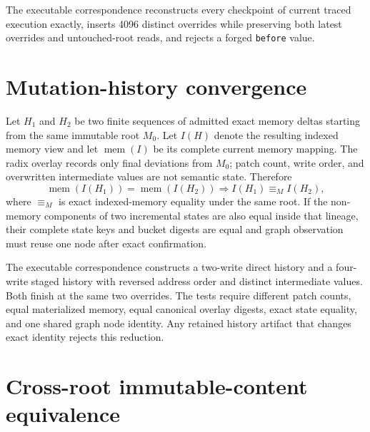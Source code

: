 \documentclass{article}
\begin{document}
The executable correspondence reconstructs every checkpoint of current traced
execution exactly, inserts 4096 distinct overrides while preserving both latest
overrides and untouched-root reads, and rejects a forged \texttt{before} value.

\section{Mutation-history convergence}

Let $H_1$ and $H_2$ be two finite sequences of admitted exact memory deltas
starting from the same immutable root $M_0$. Let $I(H)$ denote the resulting
indexed memory view and let $\operatorname{mem}(I)$ be its complete current
memory mapping. The radix overlay records only final deviations from $M_0$;
patch count, write order, and overwritten intermediate values are not semantic
state. Therefore
\begin{equation}
  \operatorname{mem}(I(H_1))=\operatorname{mem}(I(H_2))
  \Longrightarrow I(H_1)\equiv_M I(H_2),
  \label{eq:state-graph-mutation-history-convergence}
\end{equation}
where $\equiv_M$ is exact indexed-memory equality under the same root. If the
non-memory components of two incremental states are also equal inside that
lineage, their complete state keys and bucket digests are equal and graph
observation must reuse one node after exact confirmation.

The executable correspondence constructs a two-write direct history and a
four-write staged history with reversed address order and distinct intermediate
values. Both finish at the same two overrides. The tests require different patch
counts, equal materialized memory, equal canonical overlay digests, exact state
equality, and one shared graph node identity. Any retained history artifact that
changes exact identity rejects this reduction.

\section{Cross-root immutable-content equivalence}
\end{document}
